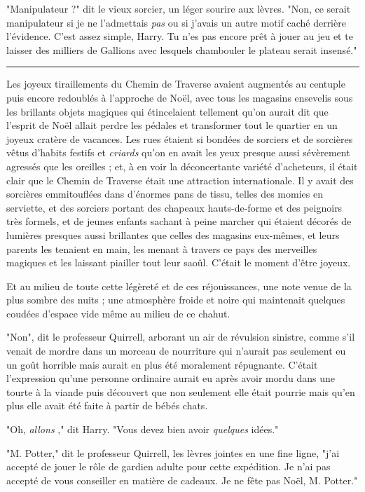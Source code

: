 "Manipulateur ?" dit le vieux sorcier, un léger sourire aux lèvres. "Non, ce serait manipulateur si je ne l'admettais \emph{pas}  ou si j'avais un autre motif caché derrière l'évidence. C'est assez simple, Harry. Tu n'es pas encore prêt à jouer au jeu et te laisser des milliers de Gallions avec lesquels chambouler le plateau serait insensé."
\par\noindent\rule{\textwidth}{0.4pt}
Les joyeux tiraillements du Chemin de Traverse avaient augmentés au centuple puis encore redoublés à l'approche de Noël, avec tous les magasins ensevelis sous les brillants objets magiques qui étincelaient tellement qu'on aurait dit que l'esprit de Noël allait perdre les pédales et transformer tout le quartier en un joyeux cratère de vacances. Les rues étaient si bondées de sorciers et de sorcières vêtus d'habits festifs et \emph{criards}  qu'on en avait les yeux presque aussi sévèrement agressés que les oreilles ; et, à en voir la déconcertante variété d'acheteurs, il était clair que le Chemin de Traverse était une attraction internationale. Il y avait des sorcières emmitouflées dans d'énormes pans de tissu, telles des momies en serviette, et des sorciers portant des chapeaux hauts-de-forme et des peignoirs très formels, et de jeunes enfants sachant à peine marcher qui étaient décorés de lumières presques aussi brillantes que celles des magasins eux-mêmes, et leurs parents les tenaient en main, les menant à travers ce pays des merveilles magiques et les laissant piailler tout leur saoûl. C'était le moment d'être joyeux.

Et au milieu de toute cette légèreté et de ces réjouissances, une note venue de la plus sombre des nuits ; une atmosphère froide et noire qui maintenait quelques coudées d'espace vide même au milieu de ce chahut.

"Non", dit le professeur Quirrell, arborant un air de révulsion sinistre, comme s'il venait de mordre dans un morceau de nourriture qui n'aurait pas seulement eu un goût horrible mais aurait en plus été moralement répugnante. C'était l'expression qu'une personne ordinaire aurait eu après avoir mordu dans une tourte à la viande puis découvert que non seulement elle était pourrie mais qu'en plus elle avait été faite à partir de bébés chats.

"Oh, \emph{allons} ," dit Harry. "Vous devez bien avoir \emph{quelques}  idées."

"M. Potter," dit le professeur Quirrell, les lèvres jointes en une fine ligne, "j'ai accepté de jouer le rôle de gardien adulte pour cette expédition. Je n'ai pas accepté de vous conseiller en matière de cadeaux. Je ne fête pas Noël, M. Potter."


